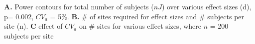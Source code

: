 \label{fig:power} \textbf{A.} Power contours for total number of subjects ($nJ$) over various effect sizes (d), p= 0.002, $CV_a$ = 5\%. \textbf{B.} \# of sites required for effect sizes and \# subjects per site (n). \textbf{C} effect of $CV_a$ on \# sites for various effect sizes, where $n$ = 200 subjects per site